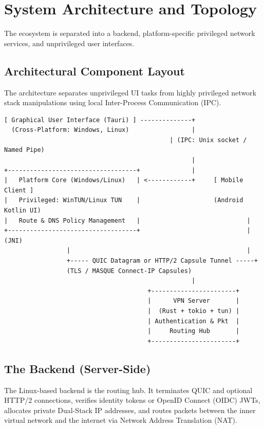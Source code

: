 \documentclass[11pt,a4paper]{article}
\begin{document}
\section{System Architecture and Topology}

The ecosystem is separated into a backend, platform-specific privileged network services, and unprivileged user interfaces.

\subsection{Architectural Component Layout}
The architecture separates unprivileged UI tasks from highly privileged network stack manipulations using local Inter-Process Communication (IPC).

{\footnotesize
\begin{verbatim}
[ Graphical User Interface (Tauri) ] --------------+
  (Cross-Platform: Windows, Linux)                 |
                                             | (IPC: Unix socket / Named Pipe)
                                                   |
+-----------------------------------+              |
|   Platform Core (Windows/Linux)   | <------------+     [ Mobile Client ]
|   Privileged: WinTUN/Linux TUN    |                    (Android Kotlin UI)
|   Route & DNS Policy Management   |                             |
+-----------------------------------+                             | (JNI)
                 |                                                |
                 +----- QUIC Datagram or HTTP/2 Capsule Tunnel -----+
                 (TLS / MASQUE Connect-IP Capsules)
                                                   |
                                       +-----------------------+
                                       |      VPN Server       |
                                       |  (Rust + tokio + tun) |
                                       | Authentication & Pkt  |
                                       |     Routing Hub       |
                                       +-----------------------+
\end{verbatim}
}

\subsection{The Backend (Server-Side)}
The Linux-based backend is the routing hub. It terminates QUIC and optional HTTP/2 connections, verifies identity tokens or OpenID Connect (OIDC) JWTs, allocates private Dual-Stack IP addresses, and routes packets between the inner virtual network and the internet via Network Address Translation (NAT).
\end{document}
